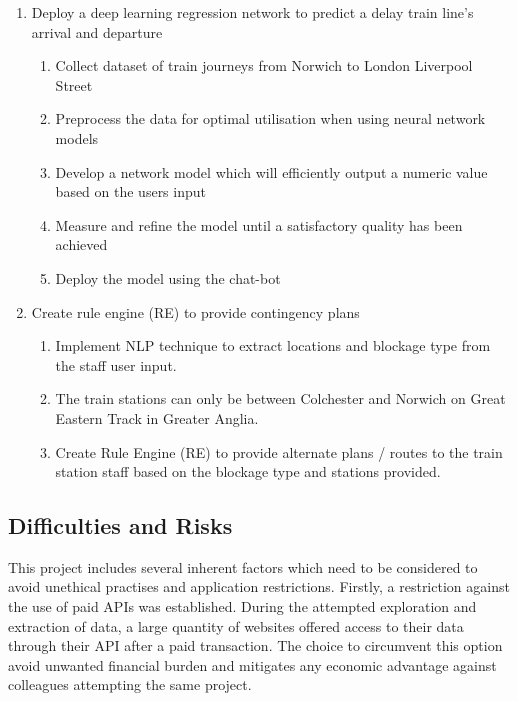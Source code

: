 \begin{enumerate}
    \item Deploy a deep learning regression network to predict a delay train line's arrival and departure
        \begin{enumerate}
            \item Collect dataset of train journeys from Norwich to London Liverpool Street
            \item Preprocess the data for optimal utilisation when using neural network models
            \item Develop a network model which will efficiently output a numeric value based on the users input
            \item Measure and refine the model until a satisfactory quality has been achieved
            \item Deploy the model using the chat-bot
        \end{enumerate}

    \item Create rule engine (RE) to provide contingency plans
        \begin{enumerate}
            \item Implement NLP technique to extract locations and blockage type from the staff user input. 
            \item The train stations can only be between Colchester and Norwich on Great Eastern Track in Greater Anglia.
            \item Create Rule Engine (RE) to provide alternate plans / routes to the train station staff based on the blockage type and stations provided.
        \end{enumerate}
\end{enumerate}

\subsection{Difficulties and Risks}
This project includes several inherent factors which need to be considered to avoid unethical practises and application restrictions. Firstly, a restriction against the use of paid APIs was established. During the attempted exploration and extraction of data, a large quantity of websites offered access to their data through their API after a paid transaction. The choice to circumvent this option avoid unwanted financial burden and mitigates any economic advantage against colleagues attempting the same project.\vspace{0.5cm}

